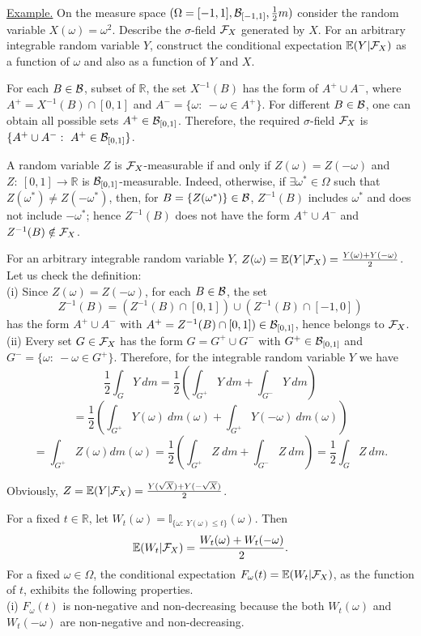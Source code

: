 \documentclass[a4paper,10pt]{article}
\def\RR{\mathbb{R}}
\def\II{\mathbb{I}}
\def\EE{\mathbb{E}}
\newcommand{\1}[1]{\mathbf{1}_{\{#1\}}}
\begin{document}
\underline{Example.} On the measure space $(\Omega=[-1,1],{\cal B}_{[-1,1]}, \frac{1}{2}m)$ consider the random variable $X(\omega)=\omega^2$. Describe the $\sigma$-field ${\cal F}_X$ generated by $X$. For an arbitrary integrable random variable $Y$, construct the conditional expectation $\EE(Y|{\cal F}_X)$ as a function of $\omega$ and also as a function of $Y$ and $X$.

For each $B\in{\cal B}$, subset of $\RR$, the set $X^{-1}(B)$ has the form of $A^+\cup A^-$, where  $A^+=X^{-1}(B)\cap[0,1]$ and $A^-=\{\omega:~-\omega\in A^+\}$. For different $B\in{\cal B}$, one can obtain all possible sets $A^+\in{\cal B}_{[0,1]}$.
Therefore, the required $\sigma$-field ${\cal F}_X$ is $\{A^+\cup A^-:~A^+\in{\cal B}_{[0,1]}\}$.

A random variable $Z$ is ${\cal F}_X$-measurable if and only if $Z(\omega)=Z(-\omega)$ and $Z:~[0,1]\to\RR$ is ${\cal B}_{[0,1]}$-measurable. Indeed, otherwise, if $\exists\omega^*\in\Omega$ such that $Z(\omega^*)\ne Z(-\omega^*)$, then, for $B=\{Z(\omega^*)\}\in{\cal B}$, $Z^{-1}(B)$ includes $\omega^*$ and does not include $-\omega^*$; hence $Z^{-1}(B)$ does not have the form $A^+\cup A^-$ and $Z^{-1}(B)\notin{\cal F}_X$.

For an arbitrary integrable random variable $Y$, $Z(\omega)=\EE(Y|{\cal F}_X)=\frac{Y(\omega)+Y(-\omega)}{2}$. Let us check the definition:\\
(i) Since $Z(\omega)=Z(-\omega)$, for each $B\in{\cal B}$, the set
$$Z^{-1}(B)=(Z^{-1}(B)\cap[0,1])\cup (Z^{-1}(B)\cap[-1,0])$$
has the form $A^+\cup A^-$ with $A^+=Z^{-1}(B)\cap[0,1])\in{\cal B}_{[0,1]}$, hence belongs to ${\cal F}_X$.\\
(ii) Every set $G\in{\cal F}_X$ has the form $G=G^+\cup G^-$ with $G^+\in{\cal B}_{[0,1]}$ and $G^-=\{\omega:~-\omega\in G^+\}$. Therefore, for the integrable random variable $Y$ we have
$$\frac{1}{2}\int_G Y~dm=\frac{1}{2}\left(\int_{G^+} Y~dm+ \int_{G^-} Y~dm\right)$$
$$=\frac{1}{2}\left(\int_{G^+} Y(\omega)~dm(\omega)+ \int_{G^+} Y(-\omega)~dm(\omega)\right)$$
$$=\int_{G^+} Z(\omega)dm(\omega)=\frac{1}{2}\left(\int_{G^+} Z~dm+ \int_{G^-} Z~dm\right)=\frac{1}{2}\int_G Z~dm.$$

Obviously, $Z=\EE(Y|{\cal F}_X)=\frac{Y(\sqrt{X})+Y(-\sqrt{X})}{2}$.

For a fixed $t\in\RR$, let $W_t(\omega)=\II_{\{\omega:~Y(\omega)\le t\}}(\omega)$. Then
$$\EE(W_t|{\cal F}_X)=\frac{W_t(\omega)+W_t(-\omega)}{2}.$$
For a fixed $\omega\in\Omega$, the conditional expectation $F_\omega(t)=\EE(W_t|{\cal F}_X)$, as the function of $t$, exhibits the following properties.\\
(i) $F_\omega(t)$ is non-negative and non-decreasing because the both $W_t(\omega)$ and $W_t(-\omega)$ are non-negative and non-decreasing. \vspace{3cm}
\end{document}
